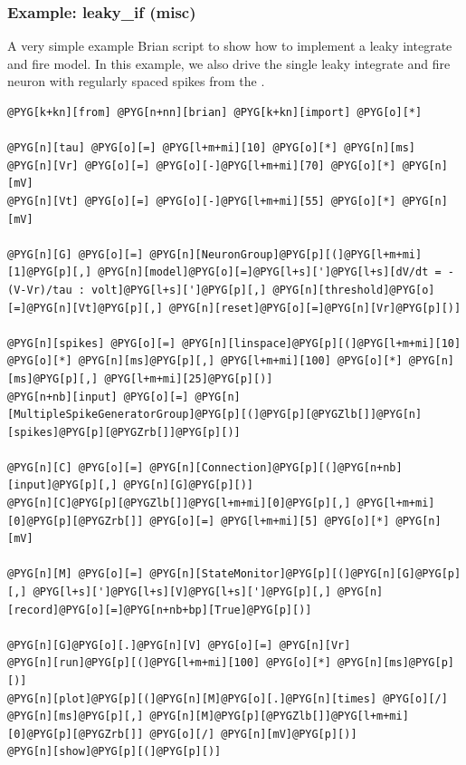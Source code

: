 \documentclass[letterpaper,10pt,english]{manual}
\begin{document}
\resetcurrentobjects
\hypertarget{--doc-examples-misc_leaky_if}{}

\hypertarget{index-51}{}\subsubsection{Example: leaky\_if (misc)}

A very simple example Brian script to show how to implement
a leaky integrate and fire model. In this example, we also
drive the single leaky integrate and fire neuron with
regularly spaced spikes from the \hyperlink{brian.SpikeGeneratorGroup}{}.

\begin{Verbatim}[commandchars=@\[\]]
@PYG[k+kn][from] @PYG[n+nn][brian] @PYG[k+kn][import] @PYG[o][*]

@PYG[n][tau] @PYG[o][=] @PYG[l+m+mi][10] @PYG[o][*] @PYG[n][ms]
@PYG[n][Vr] @PYG[o][=] @PYG[o][-]@PYG[l+m+mi][70] @PYG[o][*] @PYG[n][mV]
@PYG[n][Vt] @PYG[o][=] @PYG[o][-]@PYG[l+m+mi][55] @PYG[o][*] @PYG[n][mV]

@PYG[n][G] @PYG[o][=] @PYG[n][NeuronGroup]@PYG[p][(]@PYG[l+m+mi][1]@PYG[p][,] @PYG[n][model]@PYG[o][=]@PYG[l+s][']@PYG[l+s][dV/dt = -(V-Vr)/tau : volt]@PYG[l+s][']@PYG[p][,] @PYG[n][threshold]@PYG[o][=]@PYG[n][Vt]@PYG[p][,] @PYG[n][reset]@PYG[o][=]@PYG[n][Vr]@PYG[p][)]

@PYG[n][spikes] @PYG[o][=] @PYG[n][linspace]@PYG[p][(]@PYG[l+m+mi][10] @PYG[o][*] @PYG[n][ms]@PYG[p][,] @PYG[l+m+mi][100] @PYG[o][*] @PYG[n][ms]@PYG[p][,] @PYG[l+m+mi][25]@PYG[p][)]
@PYG[n+nb][input] @PYG[o][=] @PYG[n][MultipleSpikeGeneratorGroup]@PYG[p][(]@PYG[p][@PYGZlb[]]@PYG[n][spikes]@PYG[p][@PYGZrb[]]@PYG[p][)]

@PYG[n][C] @PYG[o][=] @PYG[n][Connection]@PYG[p][(]@PYG[n+nb][input]@PYG[p][,] @PYG[n][G]@PYG[p][)]
@PYG[n][C]@PYG[p][@PYGZlb[]]@PYG[l+m+mi][0]@PYG[p][,] @PYG[l+m+mi][0]@PYG[p][@PYGZrb[]] @PYG[o][=] @PYG[l+m+mi][5] @PYG[o][*] @PYG[n][mV]

@PYG[n][M] @PYG[o][=] @PYG[n][StateMonitor]@PYG[p][(]@PYG[n][G]@PYG[p][,] @PYG[l+s][']@PYG[l+s][V]@PYG[l+s][']@PYG[p][,] @PYG[n][record]@PYG[o][=]@PYG[n+nb+bp][True]@PYG[p][)]

@PYG[n][G]@PYG[o][.]@PYG[n][V] @PYG[o][=] @PYG[n][Vr]
@PYG[n][run]@PYG[p][(]@PYG[l+m+mi][100] @PYG[o][*] @PYG[n][ms]@PYG[p][)]
@PYG[n][plot]@PYG[p][(]@PYG[n][M]@PYG[o][.]@PYG[n][times] @PYG[o][/] @PYG[n][ms]@PYG[p][,] @PYG[n][M]@PYG[p][@PYGZlb[]]@PYG[l+m+mi][0]@PYG[p][@PYGZrb[]] @PYG[o][/] @PYG[n][mV]@PYG[p][)]
@PYG[n][show]@PYG[p][(]@PYG[p][)]
\end{Verbatim}
\end{document}
